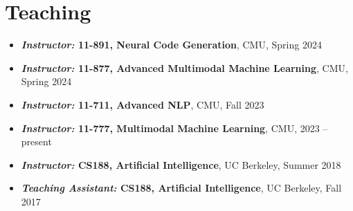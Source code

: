 \section{Teaching}
\begin{itemize}[leftmargin=-0.4mm,partopsep=0pt,label=]
  \item \textbf{\emph{Instructor:} 11-891, Neural Code Generation}, CMU, Spring 2024
  \item \textbf{\emph{Instructor:} 11-877, Advanced Multimodal Machine Learning}, CMU, Spring 2024
  \item \textbf{\emph{Instructor:} 11-711, Advanced NLP}, CMU, Fall 2023
  \item \textbf{\emph{Instructor:} 11-777, Multimodal Machine Learning}, CMU, 2023 -- present

  \item \textbf{\emph{Instructor:} CS188, Artificial Intelligence}, UC Berkeley, Summer 2018
  \begin{comment}
    \begin{itemize}
      \item Co-taught (with Anwar Baroudi) a 160-student upper-division undergraduate introduction to AI. 
      \item Topics: search, games, Markov decision processes, reinforcement learning, graphical models, and machine learning.
      \item Prepared and delivered lectures; co-managed an 8-person course staff; designed exams; \\ co-supervised redesign of a course project; managed course logistics; held office hours and graded.
      \item Received UC Berkeley's Outstanding Graduate Instructor Award.
      \item \emph{Teaching effectiveness rating: 6.2 / 7}. The department average is 5.9 / 7. Rated in the top 25\% of instructors for this course in the last 10 years by teaching effectiveness.
    \end{itemize}
  \end{comment}

\item \textbf{\emph{Teaching Assistant:} CS188, Artificial Intelligence}, UC Berkeley, Fall 2017 
  \begin{comment}
    \begin{itemize}
      \item Teaching assistant for a 600-student upper-division undergraduate course.
      \item Taught a weekly section of students; helped design a machine learning project which has been completed by over 4,000 students at Berkeley in semesters since; helped write course notes, exams, and section problems; held office hours and graded.
      \item \emph{Teaching effectiveness rating: 4.6 / 5}. The department average is 4.3 / 5.
    \end{itemize}
  \end{comment}


\end{itemize}
